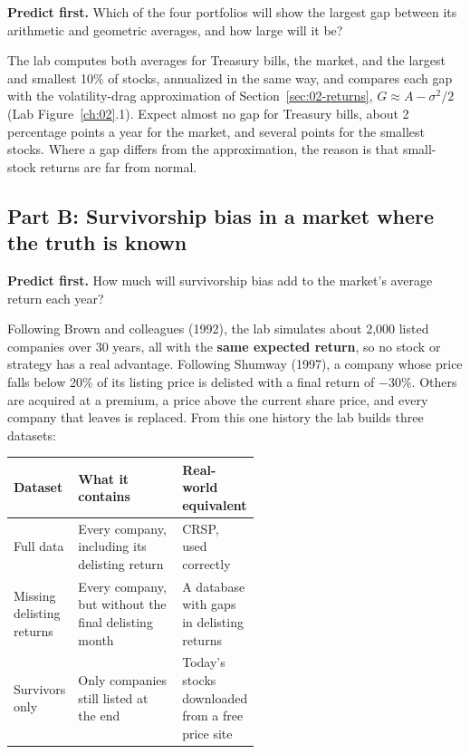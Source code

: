 \textbf{Predict first.} Which of the four portfolios will show the largest gap between its arithmetic and geometric averages, and how large will it be?

The lab computes both averages for Treasury bills, the market, and the largest and smallest 10\% of stocks, annualized in the same way, and compares each gap with the volatility-drag approximation of Section~\ref{sec:02-returns}, $G \approx A - \sigma^2/2$ (Lab Figure~\ref{ch:02}.1). Expect almost no gap for Treasury bills, about 2 percentage points a year for the market, and several points for the smallest stocks. Where a gap differs from the approximation, the reason is that small-stock returns are far from normal.

\subsection*{Part B: Survivorship bias in a market where the truth is known}

\textbf{Predict first.} How much will survivorship bias add to the market's average return each year?

Following Brown and colleagues (1992), the lab simulates about 2,000 listed companies over 30 years, all with the \textbf{same expected return}, so no stock or strategy has a real advantage. Following Shumway (1997), a company whose price falls below 20\% of its listing price is delisted with a final return of $-30$\%. Others are acquired at a premium, a price above the current share price, and every company that leaves is replaced. From this one history the lab builds three datasets:

\begin{center}
\small
\begin{tabularx}{0.9\linewidth}{@{}>{\raggedright\arraybackslash}p{0.26\linewidth}>{\raggedright\arraybackslash}X>{\raggedright\arraybackslash}p{0.28\linewidth}@{}}
\toprule
Dataset & What it contains & Real-world equivalent \\
\midrule
Full data & Every company, including its delisting return & CRSP, used correctly \\
Missing delisting returns & Every company, but without the final delisting month & A database with gaps in delisting returns \\
Survivors only & Only companies still listed at the end & Today's stocks downloaded from a free price site \\
\bottomrule
\end{tabularx}
\end{center}

